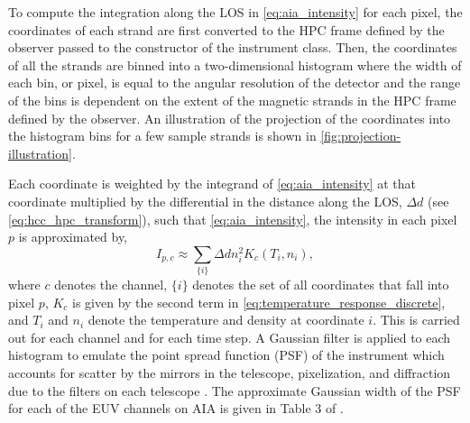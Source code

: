 To compute the integration along the LOS in \autoref{eq:aia_intensity} for each pixel, the coordinates of each strand are first converted to the HPC frame defined by the observer passed to the constructor of the instrument class. Then, the coordinates of all the strands are binned into a two-dimensional histogram where the width of each bin, or pixel, is equal to the angular resolution of the detector and the range of the bins is dependent on the extent of the magnetic strands in the HPC frame defined by the observer. An illustration of the projection of the coordinates into the histogram bins for a few sample strands is shown in \autoref{fig:projection-illustration}.

Each coordinate is weighted by the integrand of \autoref{eq:aia_intensity} at that coordinate multiplied by the differential in the distance along the LOS, $\Delta d$ (see \autoref{eq:hcc_hpc_transform}), such that \autoref{eq:aia_intensity}, the intensity in each pixel $p$ is approximated by,
\begin{equation}\label{eq:approximate-intensity}
I_{p,c} \approx \sum_{\{i\}}\Delta d n_i^2 K_c(T_i,n_i),
\end{equation}
where $c$ denotes the channel, $\{i\}$ denotes the set of all coordinates that fall into pixel $p$, $K_c$ is given by the second term in \autoref{eq:temperature_response_discrete}, and $T_i$ and $n_i$ denote the temperature and density at coordinate $i$. This is carried out for each channel and for each time step. A Gaussian filter is applied to each histogram to emulate the point spread function (PSF) of the instrument which accounts for scatter by the mirrors in the telescope, pixelization, and diffraction due to the filters on each telescope \citep{grigis_aia_2012}. The approximate Gaussian width of the PSF for each of the EUV channels on AIA is given in Table 3 of \citet{grigis_aia_2012}.

